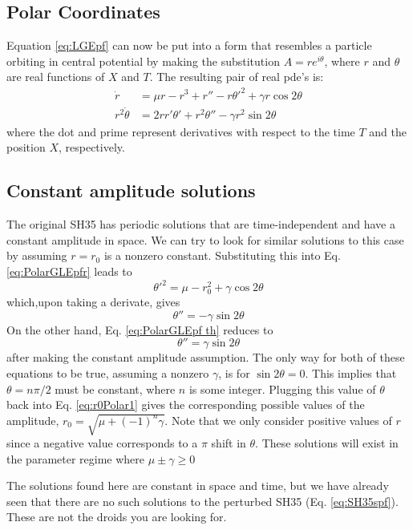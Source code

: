 \documentclass[api,pof,pre,12pt,a4paper]{revtex4-1}
\newcommand{\beqn}{\begin{equation}}
\newcommand{\eeqn}{\end{equation}}
\begin{document}
\subsection{Polar Coordinates}
Equation \ref{eq:LGEpf}  can now be put into a form that resembles a particle orbiting in central potential by making the substitution $A=r e^{i\theta}$, where $r$ and $\theta$ are real functions of $X$ and $T$.  The resulting pair of real pde's is:
\begin{subequations}
\begin{align}
\dot{r}&=\mu r - r^3 +r''-r\theta'^2+\gamma r \cos2\theta 
\label{eq:PolarGLEpfr} \\
r^2\dot{\theta}&=2 r r' \theta'+r^2\theta''-\gamma r^2 \sin 2\theta
\label{eq:PolarGLEpfth}
\end{align}
\end{subequations}
where the dot and prime represent derivatives with respect to the time $T$ and the position $X$, respectively.

\subsection{Constant amplitude solutions}
The original SH35 has periodic solutions that are time-independent and have a constant amplitude in space.  We can try to look for similar solutions to this case by assuming $r=r_0$ is a nonzero constant. Substituting this into Eq. \ref{eq:PolarGLEpfr} leads to
\beqn
\theta'^2=\mu-r_0^2+\gamma \cos2\theta
\label{eq:r0Polar1}
\eeqn
which,upon taking a derivate, gives
\beqn
\theta''=-\gamma \sin2\theta
\eeqn
On the other hand, Eq. \ref{eq:PolarGLEpf th} reduces to 
\beqn
\theta''=\gamma \sin2\theta
\eeqn
after making the constant amplitude assumption.  The only way for both of these equations to be true, assuming a nonzero $\gamma$, is for $\sin2\theta=0$. This implies that $\theta=n\pi/2$ must be constant, where $n$ is some integer.  Plugging this value of $\theta$ back into Eq. \ref{eq:r0Polar1} gives the corresponding possible values of the amplitude, $r_0=\sqrt{\mu +(-1)^n\gamma}$. Note that we only consider positive values of $r$ since a negative value corresponds to a $\pi$ shift in $\theta$. These solutions will exist in the parameter regime where $\mu\pm\gamma\ge 0$

The solutions found here are constant in space and time, but we have already seen that there are no such solutions to the perturbed SH35 (Eq. \ref{eq:SH35spf}). These are not the droids you are looking for. 
\end{document}
